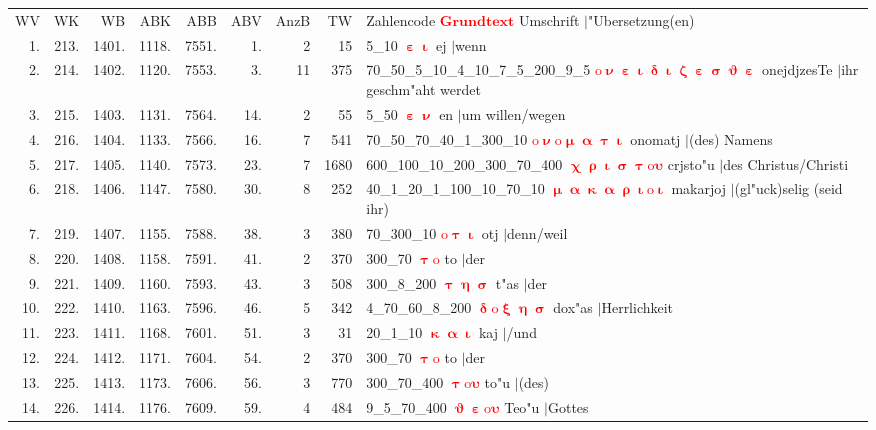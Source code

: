 \documentclass[a4paper,10pt,landscape]{article}
\begin{document}
\begin{tabular}{rrrrrrrrp{120mm}}
WV&WK&WB&ABK&ABB&ABV&AnzB&TW&Zahlencode \textcolor{red}{$\boldsymbol{Grundtext}$} Umschrift $|$"Ubersetzung(en)\\
1.&213.&1401.&1118.&7551.&1.&2&15&5\_10 \textcolor{red}{$\boldsymbol{\upepsilon\upiota}$} ej $|$wenn\\
2.&214.&1402.&1120.&7553.&3.&11&375&70\_50\_5\_10\_4\_10\_7\_5\_200\_9\_5 \textcolor{red}{$\boldsymbol{\mathrm{o}\upnu\upepsilon\upiota\updelta\upiota\upzeta\upepsilon\upsigma\upvartheta\upepsilon}$} onejdjzesTe $|$ihr geschm"aht werdet\\
3.&215.&1403.&1131.&7564.&14.&2&55&5\_50 \textcolor{red}{$\boldsymbol{\upepsilon\upnu}$} en $|$um willen/wegen\\
4.&216.&1404.&1133.&7566.&16.&7&541&70\_50\_70\_40\_1\_300\_10 \textcolor{red}{$\boldsymbol{\mathrm{o}\upnu\mathrm{o}\upmu\upalpha\uptau\upiota}$} onomatj $|$(des) Namens\\
5.&217.&1405.&1140.&7573.&23.&7&1680&600\_100\_10\_200\_300\_70\_400 \textcolor{red}{$\boldsymbol{\upchi\uprho\upiota\upsigma\uptau\mathrm{o}\upsilon}$} crjsto"u $|$des Christus/Christi\\
6.&218.&1406.&1147.&7580.&30.&8&252&40\_1\_20\_1\_100\_10\_70\_10 \textcolor{red}{$\boldsymbol{\upmu\upalpha\upkappa\upalpha\uprho\upiota\mathrm{o}\upiota}$} makarjoj $|$(gl"uck)selig (seid ihr)\\
7.&219.&1407.&1155.&7588.&38.&3&380&70\_300\_10 \textcolor{red}{$\boldsymbol{\mathrm{o}\uptau\upiota}$} otj $|$denn/weil\\
8.&220.&1408.&1158.&7591.&41.&2&370&300\_70 \textcolor{red}{$\boldsymbol{\uptau\mathrm{o}}$} to $|$der\\
9.&221.&1409.&1160.&7593.&43.&3&508&300\_8\_200 \textcolor{red}{$\boldsymbol{\uptau\upeta\upsigma}$} t"as $|$der\\
10.&222.&1410.&1163.&7596.&46.&5&342&4\_70\_60\_8\_200 \textcolor{red}{$\boldsymbol{\updelta\mathrm{o}\upxi\upeta\upsigma}$} dox"as $|$Herrlichkeit\\
11.&223.&1411.&1168.&7601.&51.&3&31&20\_1\_10 \textcolor{red}{$\boldsymbol{\upkappa\upalpha\upiota}$} kaj $|$/und\\
12.&224.&1412.&1171.&7604.&54.&2&370&300\_70 \textcolor{red}{$\boldsymbol{\uptau\mathrm{o}}$} to $|$der\\
13.&225.&1413.&1173.&7606.&56.&3&770&300\_70\_400 \textcolor{red}{$\boldsymbol{\uptau\mathrm{o}\upsilon}$} to"u $|$(des)\\
14.&226.&1414.&1176.&7609.&59.&4&484&9\_5\_70\_400 \textcolor{red}{$\boldsymbol{\upvartheta\upepsilon\mathrm{o}\upsilon}$} Teo"u $|$Gottes\\

\end{tabular}
\end{document}

